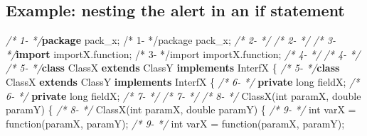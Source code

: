 \documentclass[
]{article}
\newenvironment{Shaded}{\begin{snugshade}}{\end{snugshade}}
\newcommand{\CommentTok}[1]{\textcolor[rgb]{0.56,0.35,0.01}{\textit{#1}}}
\newcommand{\DataTypeTok}[1]{\textcolor[rgb]{0.13,0.29,0.53}{#1}}
\newcommand{\FunctionTok}[1]{\textcolor[rgb]{0.00,0.00,0.00}{#1}}
\newcommand{\ImportTok}[1]{#1}
\newcommand{\KeywordTok}[1]{\textcolor[rgb]{0.13,0.29,0.53}{\textbf{#1}}}
\newcommand{\NormalTok}[1]{#1}
\begin{document}
\begin{landscape}

\subsection{Example: nesting the alert in an if statement} \label{example_nested_in_other_if}

\small

\normalsize

\scriptsize

\begin{Shaded}
\begin{Highlighting}[]
\CommentTok{/*  1-   */}\KeywordTok{package}\ImportTok{ pack_x;                                          /*  1-   */package pack_x;}                                          
\CommentTok{/*  2-   */}                                                         \CommentTok{/*  2-   */}                                                         
\CommentTok{/*  3-   */}\KeywordTok{import}\ImportTok{ importX.function;                                 /*  3-   */import importX.function;}                                 
\CommentTok{/*  4-   */}                                                         \CommentTok{/*  4-   */}                                                         
\CommentTok{/*  5-   */}\KeywordTok{class}\NormalTok{ ClassX }\KeywordTok{extends}\NormalTok{ ClassY }\KeywordTok{implements}\NormalTok{ InterfX \{         }\CommentTok{/*  5-   */}\KeywordTok{class}\NormalTok{ ClassX }\KeywordTok{extends}\NormalTok{ ClassY }\KeywordTok{implements}\NormalTok{ InterfX \{         }
\CommentTok{/*  6-   */}    \KeywordTok{private} \DataTypeTok{long}\NormalTok{ fieldX;                                 }\CommentTok{/*  6-   */}    \KeywordTok{private} \DataTypeTok{long}\NormalTok{ fieldX;                                 }
\CommentTok{/*  7-   */}                                                         \CommentTok{/*  7-   */}                                                         
\CommentTok{/*  8-   */}    \FunctionTok{ClassX}\NormalTok{(}\DataTypeTok{int}\NormalTok{ paramX, }\DataTypeTok{double}\NormalTok{ paramY) \{                        }\CommentTok{/*  8-   */}    \FunctionTok{ClassX}\NormalTok{(}\DataTypeTok{int}\NormalTok{ paramX, }\DataTypeTok{double}\NormalTok{ paramY) \{                          }
\CommentTok{/*  9-   */}        \DataTypeTok{int}\NormalTok{ varX = }\FunctionTok{function}\NormalTok{(paramX, paramY);                  }\CommentTok{/*  9-   */}        \DataTypeTok{int}\NormalTok{ varX = }\FunctionTok{function}\NormalTok{(paramX, paramY);                     }

\end{Highlighting}
\end{Shaded}
\end{landscape}
\end{document}
